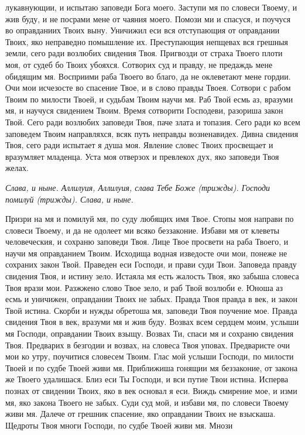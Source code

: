 лукавнующии, и испытаю заповеди Бога моего. Заступи мя по словеси
Твоему, и жив буду, и не посрами мене от чаяния моего. Помози ми и
спасуся, и поучуся во оправданиих Твоих выну. Уничижил еси вся
отступающия от оправдании Твоих, яко неправедно помышление их.
Преступающия непщевах вся грешныя земли, сего ради возлюбих
свидения Твоя. Пригвозди от страха Твоего плоти моя, от судеб бо Твоих
убояхся. Сотворих суд и правду, не предаждь мене обидящим мя.
Восприими раба Твоего во благо, да не оклеветают мене гордии. Очи
мои исчезосте во спасение Твое, и в слово правды Твоея. Сотвори с
рабом Твоим по милости Твоей, и судьбам Твоим научи мя. Раб Твой
есмь аз, вразуми мя, и научуся свидением Твоим. Время сотворити
Господеви, разориша закон Твой. Сего ради возлюбих заповеди Твоя, паче
злата и топазия. Сего ради ко всем заповедем Твоим направляхся,
всяк путь неправды возненавидех. Дивна свидения Твоя, сего ради
испытает я душа моя. Явление словес Твоих просвещает и вразумляет
младенца. Уста моя отверзох и превлекох дух, яко заповеди Твоя
желах.


 \itshape Слава, и ныне\normalfont{}. Аллилуия, Аллилуия, слава Тебе Боже \itshape (трижды)\normalfont{}.
Господи помилуй \itshape (трижды)\normalfont{}. \itshape Слава, и ныне\normalfont{}.


   Призри на мя и помилуй мя, по суду любящих имя Твое. Стопы моя
направи по словеси Твоему, и да не одолеет ми всяко беззаконие. Избави мя
от клеветы человеческия, и сохраню заповеди Твоя. Лице Твое просвети на
раба Твоего, и научи мя оправданием Твоим. Исходища водная изведосте
очи мои, понеже не сохраних закон Твой. Праведен еси Господи, и прави
суди Твои. Заповеда правду свидения Твоя, и истину зело. Истаяла мя есть
жалость Твоя, яко забыша словеса Твоя врази мои. Разжжено слово Твое
зело, и раб Твой возлюби е. Юноша аз есмь и уничижен, оправдании Твоих
не забых. Правда Твоя правда в век, и закон Твой истина. Скорби и нужды
обретоша мя, заповеди Твоя поучение мое. Правда свидения Твоя в
век, вразуми мя и жив буду. Возвах всем сердцем моим, услыши мя
Господи, оправдании Твоих взыщу. Возвах Ти, спаси мя и сохраню
свидения Твоя. Предварих в безгодии и возвах, на словеса Твоя уповах.
Предваристе очи мои ко утру, поучитися словесем Твоим. Глас мой услыши
Господи, по милости Твоей и по судбе Твоей живи мя. Приближиша
гонящии мя беззаконие, от закона же Твоего удалишася. Близ еси
Ты Господи, и вси путие Твои истина. Исперва познах от свидении
Твоих, яко в век основал я еси. Виждь смирение мое, и изми мя, яко
закона Твоего не забых. Суди суд мой, и избави мя, по словеси Твоему
живи мя. Далече от грешник спасение, яко оправдании Твоих не
взыскаша. Щедроты Твоя многи Господи, по судбе Твоей живи мя. Мнози

